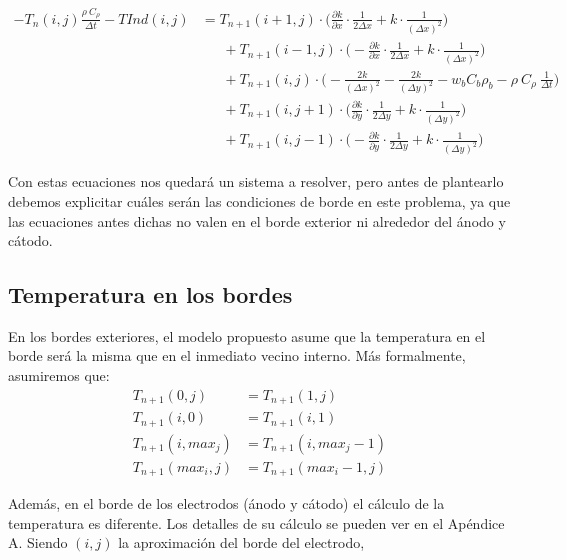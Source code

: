 \documentclass[a4paper]{article}
\begin{document}
\begin{equation*}
\begin{aligned}
- T_n(i,j) \frac{\rho \ C_\rho}{\Delta t} - TInd(i,j) &= T_{n+1}(i+1,j) \cdot \bigg(\frac{\partial k}{\partial x} \cdot \frac{1}{2\Delta x} +  k \cdot\frac{1}{(\Delta x)^2}\bigg) \\ & \ \ \ \ \ \ \ + T_{n+1}(i-1,j) \cdot \bigg(-\frac{\partial k}{\partial x} \cdot \frac{1}{2\Delta x} + k \cdot\frac{1}{(\Delta x)^2}\bigg) \\ & \ \ \ \ \ \ \ + T_{n+1}(i,j) \cdot \bigg(-\frac{2k}{(\Delta x)^2} -\frac{2k}{(\Delta y)^2} - w_b C_b \rho_b - \rho \ C_\rho \ \frac{1}{\Delta t}\bigg) \\ & \ \ \ \ \ \ \ + T_{n+1}(i,j+1) \cdot \bigg(\frac{\partial k}{\partial y} \cdot \frac{1}{2\Delta y} + k \cdot\frac{1}{(\Delta y)^2}\bigg) \\ & \ \ \ \ \ \ \  + T_{n+1}(i,j-1) \cdot \bigg(-\frac{\partial k}{\partial y} \cdot \frac{1}{2\Delta y} + k \cdot\frac{1}{(\Delta y)^2}\bigg)
\end{aligned}
\end{equation*}

Con estas ecuaciones nos quedará un sistema a resolver, pero antes de plantearlo debemos explicitar cuáles serán las condiciones de borde en este problema, ya que las ecuaciones antes dichas no valen en el borde exterior ni alrededor del ánodo y cátodo.

\subsection{Temperatura en los bordes}
En los bordes exteriores, el modelo propuesto asume que la temperatura en el borde será la misma que en el inmediato vecino interno. Más formalmente, asumiremos que:
\begin{equation*}
\begin{aligned}
T_{n+1}(0,j) & = T_{n+1}(1,j) \\ 
T_{n+1}(i,0) & = T_{n+1}(i,1) \\
T_{n+1}(i,max_j) & = T_{n+1}(i,max_j-1) \\ 
T_{n+1}(max_i,j) & = T_{n+1}(max_i-1,j)
\end{aligned}
\end{equation*}

Además, en el borde de los electrodos (ánodo y cátodo) el cálculo de la temperatura es diferente. Los detalles de su cálculo se pueden ver en el Apéndice A. Siendo $(i,j)$ la aproximación del borde del electrodo,
\end{document}
